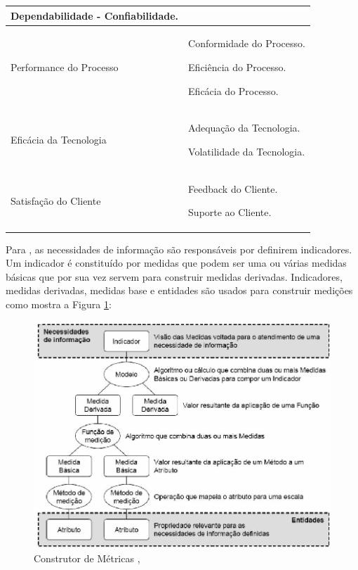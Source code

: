 \begin{longtable}{|p{185pt}|p{200pt}|}
{ 	                  Dependabilidade - Confiabilidade.
 	                  
 	             
 	                 
 	          } \\


 	\hline
 	{\raggedright Performance do Processo}
 	 & {\raggedright 
 	                  Conformidade do Processo.
 	                  
 	                 Eficiência do Processo.
 	                 
 	              Eficácia do Processo.
 	                
 	                
}\\
 	
 	\hline
 	{\raggedright Eficácia da Tecnologia}
 	 & {\raggedright 
 	                  Adequação da Tecnologia.
 	                  
 	                  Volatilidade da Tecnologia.
 	              
 }\\
 
 	\hline
 	{\raggedright Satisfação do Cliente}
 	 & {\raggedright 
 	                  Feedback do Cliente.
 	                  
 	                 Suporte ao Cliente.
 	                
}\\
 	
 	\hline
 	\end{longtable}
 
Para , as necessidades de informação são responsáveis por definirem indicadores. Um indicador é constituído por medidas que podem ser uma ou várias medidas básicas que por sua vez servem para construir medidas derivadas. Indicadores, medidas derivadas, medidas base e entidades são usados para construir medições como mostra a Figura \ref{PSM}: 

\begin{figure}[h]
\centering
\includegraphics[keepaspectratio=true,scale=0.4]{figuras/PSM.jpg}
\caption{Construtor de Métricas \cite{mcgarry},\cite{borges} }
\label{PSM}
\end{figure}

